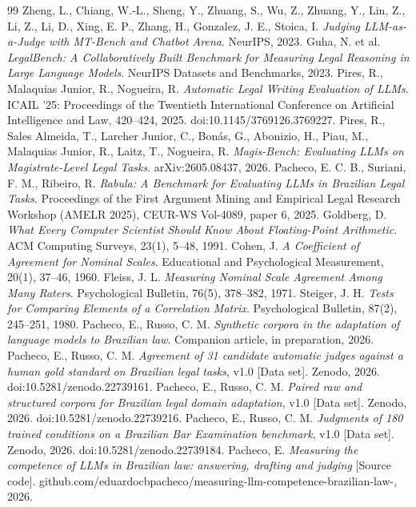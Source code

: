 \documentclass{IOS-Book-Article}
\begin{document}
\begin{thebibliography}{99}
 Zheng, L., Chiang, W.-L., Sheng, Y., Zhuang, S., Wu, Z., Zhuang, Y., Lin, Z., Li, Z., Li, D., Xing, E. P., Zhang, H., Gonzalez, J. E., Stoica, I. \emph{Judging LLM-as-a-Judge with MT-Bench and Chatbot Arena}. NeurIPS, 2023.
 Guha, N. et al. \emph{LegalBench: A Collaboratively Built Benchmark for Measuring Legal Reasoning in Large Language Models}. NeurIPS Datasets and Benchmarks, 2023.
 Pires, R., Malaquias Junior, R., Nogueira, R. \emph{Automatic Legal Writing Evaluation of LLMs}. ICAIL '25: Proceedings of the Twentieth International Conference on Artificial Intelligence and Law, 420--424, 2025. doi:10.1145/3769126.3769227.
 Pires, R., Sales Almeida, T., Larcher Junior, C., Bonás, G., Abonizio, H., Piau, M., Malaquias Junior, R., Laitz, T., Nogueira, R. \emph{Magis-Bench: Evaluating LLMs on Magistrate-Level Legal Tasks}. arXiv:2605.08437, 2026.
 Pacheco, E. C. B., Suriani, F. M., Ribeiro, R. \emph{Rabula: A Benchmark for Evaluating LLMs in Brazilian Legal Tasks}. Proceedings of the First Argument Mining and Empirical Legal Research Workshop (AMELR 2025), CEUR-WS Vol-4089, paper 6, 2025.
 Goldberg, D. \emph{What Every Computer Scientist Should Know About Floating-Point Arithmetic}. ACM Computing Surveys, 23(1), 5--48, 1991.
 Cohen, J. \emph{A Coefficient of Agreement for Nominal Scales}. Educational and Psychological Measurement, 20(1), 37--46, 1960.
 Fleiss, J. L. \emph{Measuring Nominal Scale Agreement Among Many Raters}. Psychological Bulletin, 76(5), 378--382, 1971.
 Steiger, J. H. \emph{Tests for Comparing Elements of a Correlation Matrix}. Psychological Bulletin, 87(2), 245--251, 1980.
 Pacheco, E., Russo, C. M. \emph{Synthetic corpora in the adaptation of language models to Brazilian law}. Companion article, in preparation, 2026.
 Pacheco, E., Russo, C. M. \emph{Agreement of 31 candidate automatic judges against a human gold standard on Brazilian legal tasks}, v1.0 [Data set]. Zenodo, 2026. doi:10.5281/zenodo.22739161.
 Pacheco, E., Russo, C. M. \emph{Paired raw and structured corpora for Brazilian legal domain adaptation}, v1.0 [Data set]. Zenodo, 2026. doi:10.5281/zenodo.22739216.
 Pacheco, E., Russo, C. M. \emph{Judgments of 180 trained conditions on a Brazilian Bar Examination benchmark}, v1.0 [Data set]. Zenodo, 2026. doi:10.5281/zenodo.22739184.
 Pacheco, E. \emph{Measuring the competence of LLMs in Brazilian law: answering, drafting and judging} [Source code]. github.com/eduardocbpacheco/measuring-llm-competence-brazilian-law-, 2026.

\end{thebibliography}
\end{document}
